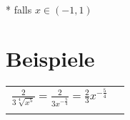 \documentclass[../main.tex]{subfiles}
\begin{document}
* falls $x \in (-1,1)$


\section{Beispiele}

\begin{tabularx}{1\textwidth} { 
    >{\centering\arraybackslash}X 
    >{\centering\arraybackslash}X  }
    \begin{math}
       \frac{2}{3\sqrt[4]{x^5}} = \frac{2}{3x^{-\frac{5}{4}}} = \frac{2}{3}x^{-\frac{5}{4}}
    \end{math}
    &
    \begin{math}
        {}
    \end{math}
    \\ [7pt]
    \begin{math}
        {}
    \end{math}
    &
    \begin{math}
        {}
    \end{math}
    \\ [7pt]
\end{tabularx}
\end{document}
